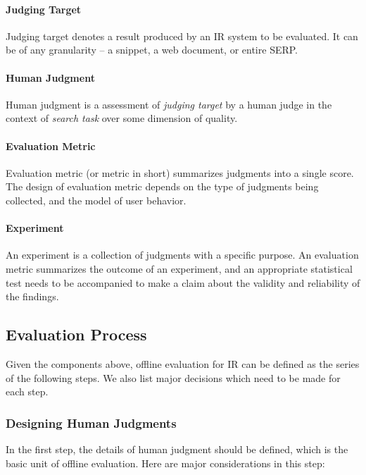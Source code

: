 \documentclass[openany]{now} %
\begin{document}
\paragraph{Judging Target} Judging target denotes a result produced by an IR system to be evaluated. It can be of any granularity -- a snippet, a web document, or entire SERP. 

\paragraph{Human Judgment} Human judgment is a assessment of \textit{judging target} by a human judge in the context of \textit{search task} over some dimension of quality. 

\paragraph{Evaluation Metric} Evaluation metric (or metric in short) summarizes judgments into a single score. The design of evaluation metric depends on the type of judgments being collected, and the model of user behavior.

\paragraph{Experiment} An experiment is a collection of judgments with a specific purpose. An evaluation metric summarizes the outcome of an experiment, and an appropriate statistical test needs to be accompanied to make a claim about the validity and reliability of the findings.


\subsection{Evaluation Process}
Given the components above, offline evaluation for IR can be defined as the series of the following steps. We also list major decisions which need to be made for each step.

\subsubsection{Designing Human Judgments}

In the first step, the details of human judgment should be defined, which is the basic unit of offline evaluation. Here are major considerations in this step:
\end{document}
